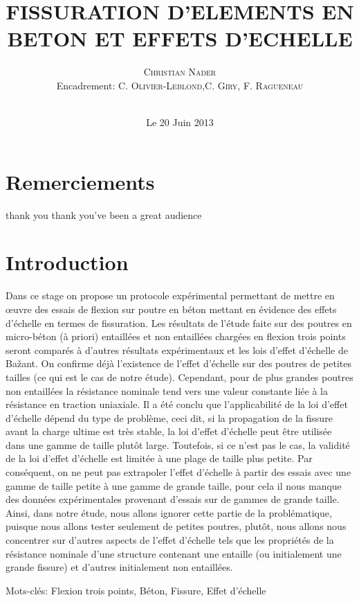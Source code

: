 \documentclass[12pt]{report}
\title{FISSURATION D'ELEMENTS EN BETON ET EFFETS D'ECHELLE}
\author{\textsc{Christian Nader}\\Encadrement: \textsc{C. Olivier-Leblond,C. Giry, F. Ragueneau}}
\date{\\Le 20 Juin 2013}
\begin{document}
  
\maketitle

\chapter*{Remerciements}
thank you thank you've been a great audience

\renewcommand{\contentsname}{Sommaire} 
\tableofcontents 

\chapter*{Introduction}
Dans ce stage on propose un protocole expérimental permettant de mettre en œuvre des essais de
flexion sur poutre en béton mettant en évidence des effets d’échelle en termes de fissuration.
Les résultats de l’étude faite sur des poutres en micro-béton (à priori) entaillées et non entaillées
chargées en flexion trois points seront comparés à d’autres résultats expérimentaux et les lois
d'effet d’échelle de Bažant. On confirme déjà l’existence de l’effet d’échelle sur des poutres de
petites tailles (ce qui est le cas de notre étude). Cependant, pour de plus grandes poutres non
entaillées la résistance nominale tend vers une valeur constante liée à la résistance en traction
uniaxiale. Il a été conclu que l'applicabilité de la loi d’effet d’échelle dépend du type de
problème, ceci dit, si la propagation de la fissure avant la charge ultime est très stable, la loi
d’effet d’échelle peut être utilisée dans une gamme de taille plutôt large. Toutefois, si ce n'est pas
le cas, la validité de la loi d’effet d’échelle est limitée à une plage de taille plus petite. Par
conséquent, on ne peut pas extrapoler l'effet d’échelle à partir des essais avec une gamme de
taille petite à une gamme de grande taille, pour cela il nous manque des données expérimentales
provenant d’essais sur de gammes de grande taille. Ainsi, dans notre étude, nous allons ignorer
cette partie de la problématique, puisque nous allons tester seulement de petites poutres, plutôt,
nous allons nous concentrer sur d'autres aspects de l’effet d’échelle tels que les propriétés de la
résistance nominale d’une structure contenant une entaille (ou initialement une grande fissure) et
d’autres initialement non entaillées.


Mots-clés: Flexion trois points, Béton, Fissure, Effet d’échelle
\end{document}
